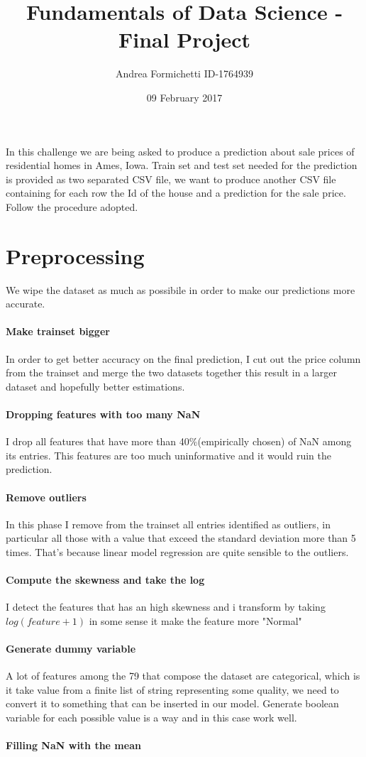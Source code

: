 \documentclass[a4paper, 11pt]{article}
\title{\vspace{-3cm}%
  Fundamentals of Data Science - Final Project \\
  \large }
\author{Andrea Formichetti ID-1764939}
\date{09 February 2017}
\begin{document}
\maketitle

In this challenge we are being asked to produce a prediction about sale prices of residential homes in Ames, Iowa. Train set and  test set needed for the prediction is provided as two separated CSV file, we want to produce another CSV file containing for each row the Id of the house and a prediction for the sale price. Follow the procedure adopted.

\section{Preprocessing}
We wipe the dataset as much as possibile in order to make our predictions more accurate.
\paragraph{Make trainset bigger}
In order to get better accuracy on the final prediction, I cut out the price column
from the trainset and merge the two datasets together this result in a larger dataset and
hopefully better estimations.
\paragraph{Dropping features with too many NaN}
I drop all features that have more than 40\%(empirically chosen) of NaN among its entries. This features are too much uninformative and it would ruin the prediction.
\paragraph{Remove outliers} 
In this phase I remove from the trainset all entries identified as outliers, in particular all those with a value that exceed the standard deviation more than 5 times. That's because linear model regression are quite sensible to the outliers. 
\paragraph{Compute the skewness and take the log}
I detect the features that has an high skewness and i transform by taking $log(feature + 1)$ in some sense it make the feature more "Normal"
\paragraph{Generate dummy variable}
A lot of features among the 79 that compose the dataset are categorical, which is it take value from a finite list of string representing some quality, we need to convert it to something that can be inserted in our model. Generate boolean variable for each possible value is a way and in this case work well.
\paragraph{Filling NaN with the mean}
\end{document}
